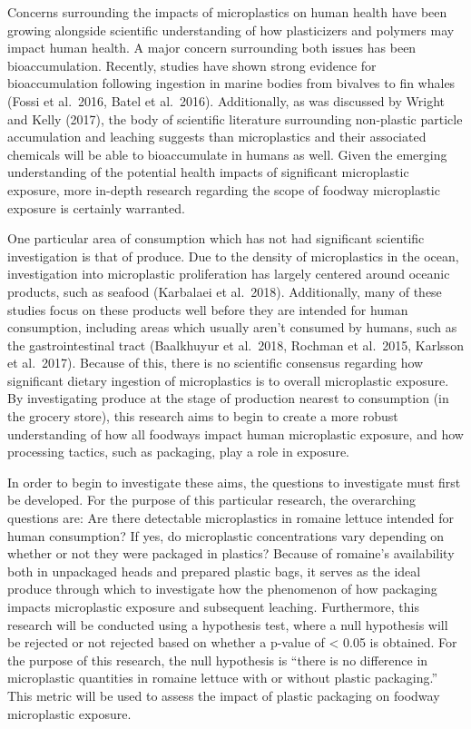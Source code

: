\documentclass[]{article}
\begin{document}
Concerns surrounding the impacts of microplastics on human health have
been growing alongside scientific understanding of how plasticizers and
polymers may impact human health. A major concern surrounding both
issues has been bioaccumulation. Recently, studies have shown strong
evidence for bioaccumulation following ingestion in marine bodies from
bivalves to fin whales (Fossi et al.~2016, Batel et al.~2016).
Additionally, as was discussed by Wright and Kelly (2017), the body of
scientific literature surrounding non-plastic particle accumulation and
leaching suggests than microplastics and their associated chemicals will
be able to bioaccumulate in humans as well. Given the emerging
understanding of the potential health impacts of significant
microplastic exposure, more in-depth research regarding the scope of
foodway microplastic exposure is certainly warranted.~

One particular area of consumption which has not had significant
scientific investigation is that of produce. Due to the density of
microplastics in the ocean, investigation into microplastic
proliferation has largely centered around oceanic products, such as
seafood (Karbalaei et al.~2018). Additionally, many of these studies
focus on these products well before they are intended for human
consumption, including areas which usually aren't consumed by humans,
such as the gastrointestinal tract (Baalkhuyur et al.~2018, Rochman et
al.~2015, Karlsson et al.~2017). Because of this, there is no scientific
consensus regarding how significant dietary ingestion of microplastics
is to overall microplastic exposure. By investigating produce at the
stage of production nearest to consumption (in the grocery store), this
research aims to begin to create a more robust understanding of how all
foodways impact human microplastic exposure, and how processing tactics,
such as packaging, play a role in exposure.~

In order to begin to investigate these aims, the questions to
investigate must first be developed. For the purpose of this particular
research, the overarching questions are: Are there detectable
microplastics in romaine lettuce intended for human consumption? If yes,
do microplastic concentrations vary depending on whether or not they
were packaged in plastics? Because of romaine's availability both in
unpackaged heads and prepared plastic bags, it serves as the ideal
produce through which to investigate how the phenomenon of how packaging
impacts microplastic exposure and subsequent leaching. Furthermore, this
research will be conducted using a hypothesis test, where a null
hypothesis will be rejected or not rejected based on whether a p-value
of \textless{} 0.05 is obtained. For the purpose of this research, the
null hypothesis is ``there is no difference in microplastic quantities
in romaine lettuce with or without plastic packaging.'' This metric will
be used to assess the impact of plastic packaging on foodway
microplastic exposure.~
\end{document}
